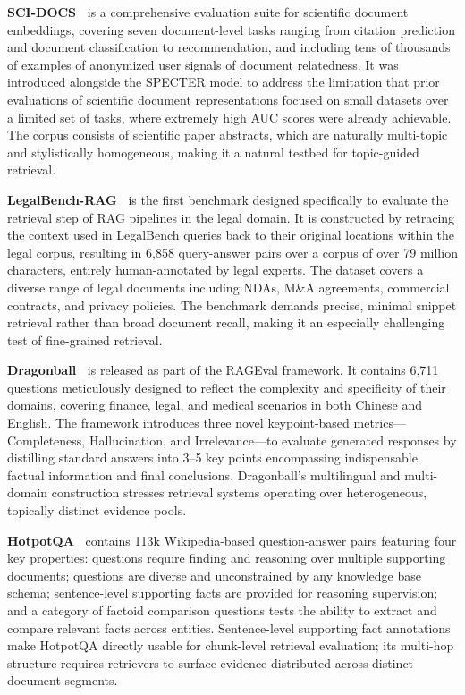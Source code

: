\noindent
\textbf{SCI-DOCS~\cite{cohan-etal-2020-specter}} is a comprehensive evaluation suite for scientific document embeddings, covering seven document-level tasks ranging from citation prediction and document classification to recommendation, and including tens of thousands of examples of anonymized user signals of document relatedness.  It was introduced alongside the SPECTER model to address the limitation that prior evaluations of scientific document representations focused on small datasets over a limited set of tasks, where extremely high AUC scores were already achievable.  The corpus consists of scientific paper abstracts, which are naturally multi-topic and stylistically homogeneous, making it a natural testbed for topic-guided retrieval.

\noindent
\textbf{LegalBench-RAG~\cite{pipitone2024legalbenchragbenchmarkretrievalaugmentedgeneration}} is the first benchmark designed specifically to evaluate the retrieval step of RAG pipelines in the legal domain. It is constructed by retracing the context used in LegalBench queries back to their original locations within the legal corpus, resulting in 6,858 query-answer pairs over a corpus of over 79 million characters, entirely human-annotated by legal experts.  The dataset covers a diverse range of legal documents including NDAs, M\&A agreements, commercial contracts, and privacy policies.  The benchmark demands precise, minimal snippet retrieval rather than broad document recall, making it an especially challenging test of fine-grained retrieval.

\noindent
\textbf{Dragonball~\cite{zhu-etal-2025-rageval}} is released as part of the RAGEval framework. It contains 6,711 questions meticulously designed to reflect the complexity and specificity of their domains, covering finance, legal, and medical scenarios in both Chinese and English.  The framework introduces three novel keypoint-based metrics—Completeness, Hallucination, and Irrelevance—to evaluate generated responses by distilling standard answers into 3–5 key points encompassing indispensable factual information and final conclusions.  Dragonball's multilingual and multi-domain construction stresses retrieval systems operating over heterogeneous, topically distinct evidence pools.

\noindent
\textbf{HotpotQA~\cite{yang-etal-2018-hotpotqa}} contains 113k Wikipedia-based question-answer pairs featuring four key properties: questions require finding and reasoning over multiple supporting documents; questions are diverse and unconstrained by any knowledge base schema; sentence-level supporting facts are provided for reasoning supervision; and a category of factoid comparison questions tests the ability to extract and compare relevant facts across entities.  Sentence-level supporting fact annotations make HotpotQA directly usable for chunk-level retrieval evaluation; its multi-hop structure requires retrievers to surface evidence distributed across distinct document segments.

